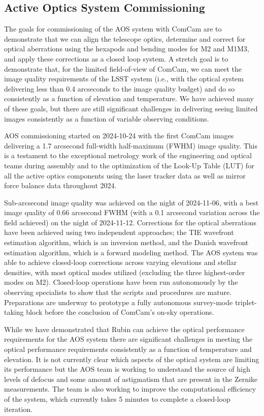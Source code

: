 \subsection{Active Optics System Commissioning}
\label{sec:aos_commissioning}

The goals for commissioning of the AOS system with ComCam are to demonstrate that we can align the telescope optics, determine and correct for optical aberrations using the hexapods and bending modes for M2 and M1M3, and apply these corrections as a closed loop system. A stretch goal is to demonstrate that, for the limited field-of-view of ComCam, we can meet the image quality requirements of the LSST system (i.e., with the optical system delivering less than 0.4 arcseconds to the image quality budget) and do so consistently as a function of elevation and temperature. We have achieved many of these goals, but there are still significant challenges in delivering seeing limited images consistently as a function of variable observing conditions.

AOS commissioning started on 2024-10-24 with the first ComCam images delivering a 1.7 arcsecond full-width half-maximum (FWHM) image quality. This is a testament to the exceptional metrology work of the engineering and optical teams during assembly and to the optimization of the Look-Up Table (LUT) for all the active optics components using the  laser tracker data as well as mirror force balance data throughout 2024. 

Sub-arcsecond image quality was achieved on the night of 2024-11-06, with a best image quality of 0.66 arcsecond FWHM (with a 0.1 arcsecond variation across the field achieved) on the night of  2024-11-12. Corrections for the optical aberrations have been achieved using two independent approaches; the TIE wavefront estimation algorithm, which is an inversion method, and the Danish wavefront estimation algorithm, which is a forward modeling method. The AOS system was able to achieve closed-loop corrections across varying elevations and stellar densities, with most optical modes utilized (excluding the three highest-order modes on M2). Closed-loop operations have been run autonomously by the observing specialists to show that the scripts and procedures are mature. Preparations are underway to prototype a fully autonomous survey-mode triplet-taking block before the conclusion of ComCam's on-sky operations.

While we have demonstrated that Rubin can achieve the optical performance requirements for the AOS system there are significant challenges in meeting the optical performance requirements consistently as a function of temperature and elevation. It is not currently clear which aspects of the optical system are limiting its performance but the AOS team is working to understand the source of high levels of defocus and some amount of astigmatism that are present in the Zernike measurements. The team is also working to improve the computational efficiency of the system, which currently takes 5 minutes to complete a closed-loop iteration. 

